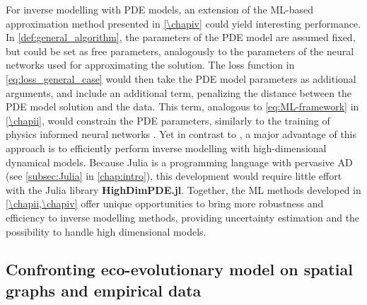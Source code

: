 For inverse modelling with PDE models, an extension of the ML-based approximation method presented in \cref{\chapiv} could yield interesting performance.
% 
In \cref{def:general_algorithm}, the parameters of the PDE model are assumed fixed, but could be set as free parameters, analogously to the parameters of the neural networks used for approximating the solution. The loss function in \cref{eq:loss_general_case} would then take the PDE model parameters as additional arguments, and include an additional term, penalizing the distance between the PDE model solution and the data. This term, analogous to \cref{eq:ML-framework} in \cref{\chapii}, would constrain the PDE parameters, similarly to the training of physics informed neural networks \citep{Raissi2019,Yazdani2020}.
% 
Yet in contrast to \cite{Raissi2019,Yazdani2020}, a major advantage of this approach is to efficiently perform inverse modelling with high-dimensional dynamical models. Because Julia is a programming language with pervasive AD (see \cref{subsec:Julia} in \cref{chap:intro}), this development would require little effort with the Julia library \textbf{HighDimPDE.jl}.
% 
Together, the ML methods developed in \cref{\chapii,\chapiv} offer unique opportunities to bring more robustness and efficiency to inverse modelling methods, providing uncertainty estimation and the possibility to handle high dimensional models.





\subsection{Confronting eco-evolutionary model on spatial graphs and empirical data}


